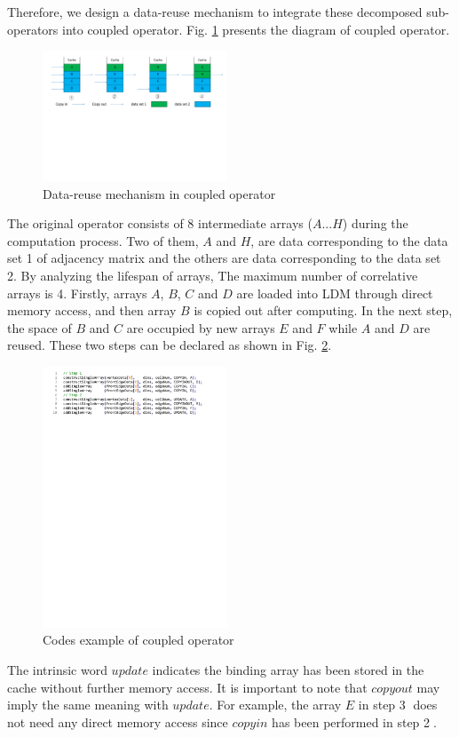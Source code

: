 \documentclass[5p,times]{elsarticle}
\begin{document}
Therefore, we design a data-reuse mechanism to integrate these decomposed sub-operators into coupled operator. Fig. \ref{coupledoperator} presents the diagram of coupled operator.
\begin{figure}[htbp]
	\centerline{\includegraphics[width=0.49\textwidth]{coupledoperator.pdf}}
	\caption{Data-reuse mechanism in coupled operator}
	\label{coupledoperator}
\end{figure}
The original operator consists of 8 intermediate arrays ($A...H$) during the computation process. Two of them, $A$ and $H$, are data corresponding to the data set 1 of adjacency matrix and the others are data corresponding to the data set 2. By analyzing the lifespan of arrays, The maximum number of correlative arrays is 4. Firstly, arrays $A$, $B$, $C$ and $D$ are loaded into LDM through direct memory access, and then array $B$ is copied out after computing. In the next step, the space of $B$ and $C$ are occupied by new arrays $E$ and $F$ while $A$ and $D$ are reused. These two steps can be declared as shown in Fig. \ref{coupledoperator_code}.
\begin{figure}[htbp]
	\centerline{\includegraphics[width=0.49\textwidth]{coupledoperator_code.pdf}}
	\caption{Codes example of coupled operator}
	\label{coupledoperator_code}
\end{figure}
The intrinsic word $update$ indicates the binding array has been stored in the cache without further memory access. It is important to note that $copyout$ may imply the same meaning with $update$. For example, the array $E$ in step \textcircled{3} does not need any direct memory access since $copyin$ has been performed in step \textcircled{2}.
\end{document}
